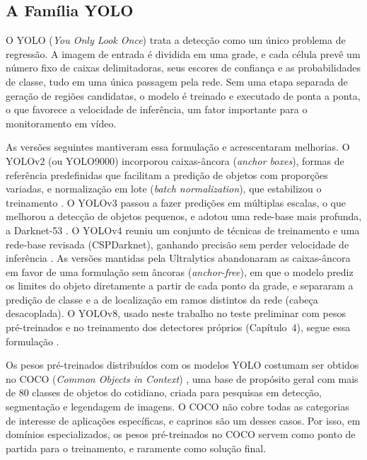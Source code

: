 \subsection{A Família YOLO}
\label{subsec:familia-yolo}

O YOLO (\textit{You Only Look Once}) \cite{redmon2016yolo} trata a detecção como um único problema de regressão. A imagem de entrada é dividida em uma grade, e cada célula prevê um número fixo de caixas delimitadoras, seus escores de confiança e as probabilidades de classe, tudo em uma única passagem pela rede. Sem uma etapa separada de geração de regiões candidatas, o modelo é treinado e executado de ponta a ponta, o que favorece a velocidade de inferência, um fator importante para o monitoramento em vídeo.

As versões seguintes mantiveram essa formulação e acrescentaram melhorias. O YOLOv2 (ou YOLO9000) incorporou caixas-âncora (\textit{anchor boxes}), formas de referência predefinidas que facilitam a predição de objetos com proporções variadas, e normalização em lote (\textit{batch normalization}), que estabilizou o treinamento \cite{redmon2017yolov2}. O YOLOv3 passou a fazer predições em múltiplas escalas, o que melhorou a detecção de objetos pequenos, e adotou uma rede-base mais profunda, a Darknet-53 \cite{redmon2018yolov3}. O YOLOv4 reuniu um conjunto de técnicas de treinamento e uma rede-base revisada (CSPDarknet), ganhando precisão sem perder velocidade de inferência \cite{bochkovskiy2020yolov4}. As versões mantidas pela Ultralytics abandonaram as caixas-âncora em favor de uma formulação sem âncoras (\textit{anchor-free}), em que o modelo prediz os limites do objeto diretamente a partir de cada ponto da grade, e separaram a predição de classe e a de localização em ramos distintos da rede (cabeça desacoplada). O YOLOv8, usado neste trabalho no teste preliminar com pesos pré-treinados e no treinamento dos detectores próprios (Capítulo~4), segue essa formulação \cite{jocher2023yolov8}.

Os pesos pré-treinados distribuídos com os modelos YOLO costumam ser obtidos no COCO (\textit{Common Objects in Context}) \cite{journals/corr/LinMBHPRDZ14}, uma base de propósito geral com mais de 80 classes de objetos do cotidiano, criada para pesquisas em detecção, segmentação e legendagem de imagens. O COCO não cobre todas as categorias de interesse de aplicações específicas, e caprinos são um desses casos. Por isso, em domínios especializados, os pesos pré-treinados no COCO servem como ponto de partida para o treinamento, e raramente como solução final.

